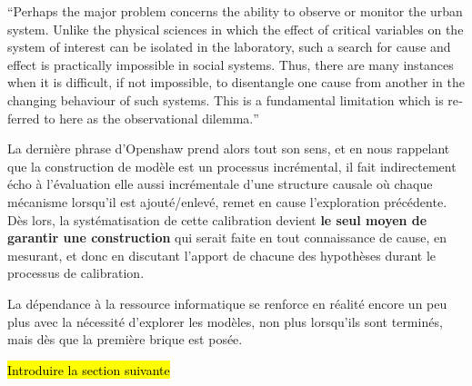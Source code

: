 \foreignquote{english}{Perhaps the major problem concerns the ability to observe or monitor the urban system. Unlike the physical sciences in which the effect of critical variables on the system of interest can be isolated in the laboratory, such a search for cause and effect is practically impossible in social systems. Thus, there are many instances when it is difficult, if not impossible, to disentangle one cause from another in the changing behaviour of such systems. This is a fundamental limitation which is referred to here as the observational dilemma.}

La dernière phrase d'Openshaw prend alors tout son sens, et en nous rappelant que la construction de modèle est un processus incrémental, il fait indirectement écho à l'évaluation elle aussi incrémentale d'une structure causale où chaque mécanisme lorsqu'il est ajouté/enlevé, remet en cause l'exploration précédente. Dès lors, la systématisation de cette calibration devient \textbf{le seul moyen de garantir une construction} qui serait faite en tout connaissance de cause, en mesurant, et donc en discutant l'apport de chacune des hypothèses durant le processus de calibration.

La dépendance à la ressource informatique se renforce en réalité encore un peu plus avec la nécessité d'explorer les modèles, non plus lorsqu'ils sont terminés, mais dès que la première brique est posée. 

\hl{Introduire la section suivante}



